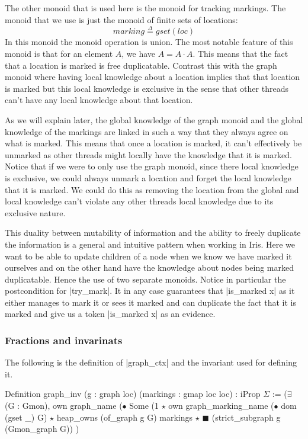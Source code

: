 \documentclass[nocopyrightspace]{sigplanconf}
\newcommand{\defeq}{\overset{\Delta}{=}}
\newcommand{\loc}{\mathit{loc}}
\newcommand{\finset}{\mathit{gset}}
\begin{document}
The other monoid that is used here is the monoid for tracking markings.
The monoid that we use is just the monoid of finite sets of locations:
\[
\mathit{marking} \defeq \finset(\loc)
\]
In this monoid the monoid operation is union.
The most notable feature of this monoid is that for an element $A$, we have $A = A \cdot A$.
This means that the fact that a location is marked is free duplicatable.
Contrast this with the graph monoid where having local knowledge
about a location implies that that location is marked but this
local knowledge is exclusive in the sense that other threads can't
have any local knowledge about that location.

As we will explain later, the global knowledge of the graph monoid and
the global knowledge of the markings are linked in such a way that
they always agree on what is marked.
This means that once a location is marked, it can't effectively be unmarked as other threads might locally have the knowledge that
it is marked.
Notice that if we were to only use the graph monoid, since there
local knowledge is exclusive, we could always unmark a location
and forget the local knowledge that it is marked.
We could do this as removing the location from the global and
local knowledge can't violate any other threads local knowledge due to
its exclusive nature.

This duality between mutability of information and the ability to freely
duplicate the information is a general and intuitive pattern when working
in Iris.
Here we want to be able to update children of a node when we know
we have marked it ourselves and on the other hand have the knowledge
about nodes being marked duplicatable. Hence the use of two separate
monoids.
Notice in particular the postcondition for \Coqe|try_mark|. It in any case
guarantees that \Coqe|is_marked x| as it either manages to mark it or
sees it marked and can duplicate the fact that it is marked and
give us a token \Coqe|is_marked x| as an evidence.

\subsubsection{Fractions and invarinats}
The following is the definition of \Coqe|graph_ctx| and the invariant
used for defining it.
\begin{Coq}
Definition graph_inv (g : graph loc) (markings : gmap loc loc)
: iProp $\Sigma$ :=
    ($\exists$ (G : Gmon), own graph_name ($\bullet$ Some (1%
      $\star$ own graph_marking_name ($\bullet$ dom (gset _) G)
      $\star$ heap_owns (of_graph g G) markings $\star$
      $\scriptscriptstyle\blacksquare$ (strict_subgraph g (Gmon_graph G))
    )%
\end{Coq}
\end{document}
